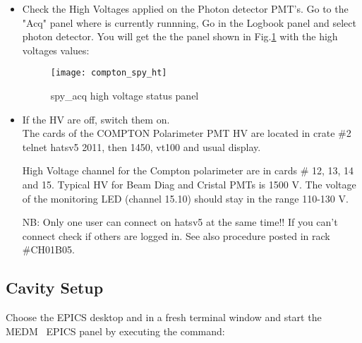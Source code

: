 {{\begin{itemize}
In a fresh terminal window, excecute the command to start 
the spy acqusition control panels\\

\\

Don't be surprised. 7 windows will be open but regroup in only one
        within few seconds. From time to time, it may happen that one window
        does not go inside  window. Click on the corresponding widget.

\item Check the High Voltages applied on the Photon detector PMT's.
Go to the "Acq" panel where  is currently runnning,
Go in the Logbook panel and select photon detector. You will get the 
the  panel shown in Fig.\ref{fig:compton_spy_ht} with the high voltages values:
\begin{figure}[htp]
    \begin{center}
        \texttt{[image: compton\_spy\_ht]}
    \end{center}
    \caption[compton:spy\_acq high voltage]{spy\_acq high voltage status panel }
    \label{fig:compton_spy_ht}
\end{figure}

\item If the HV are off, switch them on.\\
The cards of the COMPTON Polarimeter PMT HV are located in crate \#2
telnet hatsv5 2011, then 1450, vt100 and usual display.

High Voltage channel for the Compton polarimeter are in cards \# 12, 13, 14 and 15.
Typical HV for Beam Diag and Cristal PMTs is 1500 V. The voltage of the monitoring
LED (channel 15.10) should stay in the range 110-130 V.

\par NB: Only one user can connect on hatsv5 at the same time!! If you can't connect
check if others are logged in. See also procedure posted in rack \#CH01B05.
\end{itemize}

\newpage
\subsection{Cavity Setup}
Choose the EPICS desktop and in a fresh terminal window and start the MEDM~\cite{MEDMwww} EPICS panel 
 by executing  the command:\\

\\

}}
